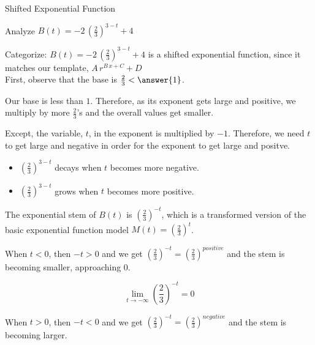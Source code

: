 \documentclass{ximera}
\begin{document}
\begin{example}  Shifted Exponential Function



Analyze   $B(t) = -2 \, \left( \frac{2}{3} \right)^{3-t} + 4$ \\


\begin{idea}


Categorize: $B(t) = -2 \, \left( \frac{2}{3} \right)^{3-t} + 4$  is a shifted exponential function, since it matches our template, $A \, r^{B \, x + C} +D$ \\




First, observe that the base is $\frac{2}{3} < \answer{1}$.


Our base is less than $1$.  Therefore, as its exponent gets large and positive, we multiply by more $\frac{2}{3}$'s and the overall values get smaller.


Except, the variable, $t$, in the exponent is multiplied by $-1$.  Therefore, we need $t$ to get large and negative in order for the exponent to get large and positve.


\begin{itemize}
\item $\left( \frac{2}{3} \right)^{3-t}$ decays when $t$ becomes more negative.
\item $\left( \frac{2}{3} \right)^{3-t}$ grows when $t$ becomes more positive.
\end{itemize}







\begin{model}

The exponential stem of $B(t)$ is $\left( \frac{2}{3} \right)^{-t}$, which is a transformed version of the basic exponential function model $M(t) = \left( \frac{2}{3} \right)^{t}$.  



When $t < 0$, then $-t > 0$ and we get  $\left( \frac{2}{3} \right)^{-t} = \left( \frac{2}{3} \right)^{positive}$ and the stem is becoming smaller, approaching $0$.  





\[ \lim\limits_{t \to -\infty} \left( \frac{2}{3} \right)^{-t} = 0 \]



When $t > 0$, then $-t < 0$ and we get  $\left( \frac{2}{3} \right)^{-t} = \left( \frac{2}{3} \right)^{negative}$ and the stem is becoming larger.  




\end{model}
\end{idea}
\end{example}
\end{document}
